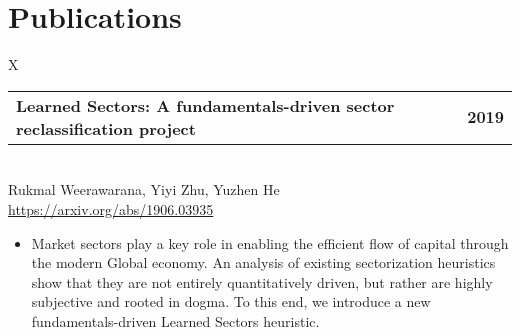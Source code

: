 \documentclass[10pt]{article}
\newcommand{\tabularxwidth}{\textwidth}
\begin{document}

    
        \section{Publications}

    
        \begin{minipage}{\tabularxwidth}
        \begin{tabularx}{\tabularxwidth}{X}
            {
                \begin{tabularx}{\tabularxwidth}{@{}X r}
                    \textbf{Learned Sectors: A fundamentals-driven sector reclassification project} &
                    \textbf{
        2019} \\
                \end{tabularx}
            } \\
            Rukmal Weerawarana, Yiyi Zhu, Yuzhen He \\

            
            
                \url{https://arxiv.org/abs/1906.03935} \\
            
            
        \end{tabularx}

        \begin{itemize}[noitemsep, topsep=3pt, parsep=0pt, partopsep=0pt]
            
                \item 
    Market sectors play a key role in enabling the efficient flow of capital through the modern Global economy. An analysis of existing sectorization heuristics show that they are not entirely quantitatively driven, but rather are highly subjective and rooted in dogma. To this end, we introduce a new fundamentals-driven Learned Sectors heuristic.
            

\end{itemize}
\end{minipage}
\end{document}
